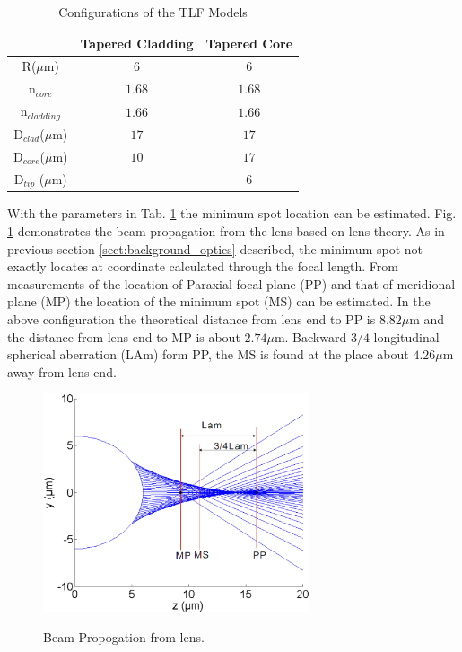\begin{table}[!ht]
\caption{Configurations of the TLF Models}
\centering
\begin{tabular}{ccc}
\hline
							&Tapered Cladding&Tapered Core\\
\hline
R($\mu$m) & $6$						 &$6$	\\
n$_{core}$&$1.68$&$1.68$\\
n$_{cladding}$&$1.66$&$1.66$\\
D$_{clad}$($\mu$m) &	$17$ &	$17$\\
D$_{core}$($\mu$m) & $10$ &	$17$\\
D$_{tip}$ ($\mu$m) & --   &	$6$\\
\hline
\end{tabular}
\label{tab:model_fiber_configuration}
\end{table}
With the parameters in Tab. \ref{tab:model_fiber_configuration} the minimum spot location can be estimated. Fig. \ref{fig:lens_spot} demonstrates the beam propagation from the lens based on lens theory. As in previous section \ref{sect:background_optics} described, the minimum spot not exactly locates at coordinate calculated through the focal length. From measurements of the location of Paraxial focal plane (PP) and that of meridional plane (MP) the location of the minimum spot (MS) can be estimated. In the above configuration the theoretical distance from lens end to PP is $8.82 \mu$m and the distance from lens end to MP is about $2.74 \mu$m. Backward $3/4$ longitudinal spherical aberration (LAm) form PP, the MS is found at the place about $4.26 \mu$m away from lens end. \\ 
\begin{figure}[!ht]
\centering
	\includegraphics[width=0.7\textwidth]{bilder/cal_min_spot}
\label{fig:lens_spot}
\caption{Beam Propogation from lens.}
\end{figure}
